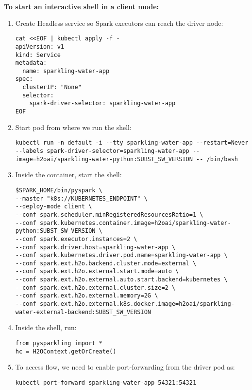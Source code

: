 \textbf{To start an interactive shell in a client mode:}

\begin{enumerate}
    \item Create Headless service so Spark executors can reach the driver node:
    \begin{lstlisting}[style=Bash]
cat <<EOF | kubectl apply -f -
apiVersion: v1
kind: Service
metadata:
  name: sparkling-water-app
spec:
  clusterIP: "None"
  selector:
    spark-driver-selector: sparkling-water-app
EOF
    \end{lstlisting}
    \item Start pod from where we run the shell:
    \begin{lstlisting}[style=Bash]
kubectl run -n default -i --tty sparkling-water-app --restart=Never --labels spark-driver-selector=sparkling-water-app --image=h2oai/sparkling-water-python:SUBST_SW_VERSION -- /bin/bash
    \end{lstlisting}
    \item Inside the container, start the shell:
    \begin{lstlisting}[style=Bash]
$SPARK_HOME/bin/pyspark \
--master "k8s://KUBERNETES_ENDPOINT" \
--deploy-mode client \
--conf spark.scheduler.minRegisteredResourcesRatio=1 \
--conf spark.kubernetes.container.image=h2oai/sparkling-water-python:SUBST_SW_VERSION \
--conf spark.executor.instances=2 \
--conf spark.driver.host=sparkling-water-app \
--conf spark.kubernetes.driver.pod.name=sparkling-water-app \
--conf spark.ext.h2o.backend.cluster.mode=external \
--conf spark.ext.h2o.external.start.mode=auto \
--conf spark.ext.h2o.external.auto.start.backend=kubernetes \
--conf spark.ext.h2o.external.cluster.size=2 \
--conf spark.ext.h2o.external.memory=2G \
--conf spark.ext.h2o.external.k8s.docker.image=h2oai/sparkling-water-external-backend:SUBST_SW_VERSION
    \end{lstlisting}
    \item Inside the shell, run:
    \begin{lstlisting}[style=Python]
from pysparkling import *
hc = H2OContext.getOrCreate()
    \end{lstlisting}
    \item To access flow, we need to enable port-forwarding from the driver pod as:
    \begin{lstlisting}[style=Bash]
kubectl port-forward sparkling-water-app 54321:54321
    \end{lstlisting}
\end{enumerate}


